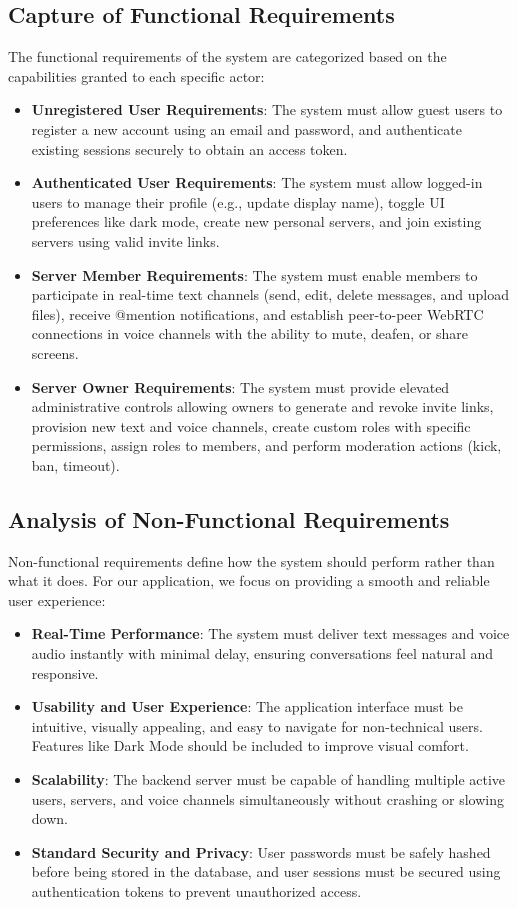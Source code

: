 \subsection{Capture of Functional Requirements}
The functional requirements of the system are categorized based on the capabilities granted to each specific actor:
\begin{itemize}
    \item \textbf{Unregistered User Requirements}: The system must allow guest users to register a new account using an email and password, and authenticate existing sessions securely to obtain an access token.
    \item \textbf{Authenticated User Requirements}: The system must allow logged-in users to manage their profile (e.g., update display name), toggle UI preferences like dark mode, create new personal servers, and join existing servers using valid invite links.
    \item \textbf{Server Member Requirements}: The system must enable members to participate in real-time text channels (send, edit, delete messages, and upload files), receive @mention notifications, and establish peer-to-peer WebRTC connections in voice channels with the ability to mute, deafen, or share screens.
    \item \textbf{Server Owner Requirements}: The system must provide elevated administrative controls allowing owners to generate and revoke invite links, provision new text and voice channels, create custom roles with specific permissions, assign roles to members, and perform moderation actions (kick, ban, timeout).
\end{itemize}

\subsection{Analysis of Non-Functional Requirements}
Non-functional requirements define how the system should perform rather than what it does. For our application, we focus on providing a smooth and reliable user experience:
\begin{itemize}
    \item \textbf{Real-Time Performance}: The system must deliver text messages and voice audio instantly with minimal delay, ensuring conversations feel natural and responsive.
    \item \textbf{Usability and User Experience}: The application interface must be intuitive, visually appealing, and easy to navigate for non-technical users. Features like Dark Mode should be included to improve visual comfort.
    \item \textbf{Scalability}: The backend server must be capable of handling multiple active users, servers, and voice channels simultaneously without crashing or slowing down.
    \item \textbf{Standard Security and Privacy}: User passwords must be safely hashed before being stored in the database, and user sessions must be secured using authentication tokens to prevent unauthorized access.
\end{itemize}

